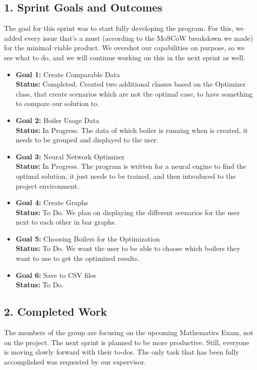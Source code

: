 \documentclass[12pt]{report}
\begin{document}
\subsection*{1. Sprint Goals and Outcomes}
The goal for this sprint was to start fully developing the program. For this, we added every issue that's a must (according to the MoSCoW breakdown we made) for the minimal viable product. We overshot our capabilities on purpose, so we see what to do, and we will continue working on this in the next sprint as well.
\begin{itemize}
    \item \textbf{Goal 1:} Create Comparable Data\\
    \textbf{Status:} Completed. Created two additional classes based on the Optimizer class, that create scenarios which are not the optimal case, to have something to compare our solution to.
    \item \textbf{Goal 2:} Boiler Usage Data\\
    \textbf{Status:} In Progress. The data of which boiler is running when is created, it needs to be grouped and displayed to the user.
    \item \textbf{Goal 3:} Neural Network Optimizer\\
    \textbf{Status:} In Progress. The program is written for a neural engine to find the optimal solution, it just needs to be trained, and then introduced to the project environment.
    \item \textbf{Goal 4:} Create Graphs\\
    \textbf{Status:} To Do. We plan on displaying the different scenarios for the user next to each other in bar graphs.
    \item \textbf{Goal 5:} Choosing Boilers for the Optimization\\
    \textbf{Status:} To Do. We want the user to be able to choose which boilers they want to use to get the optimized results.
    \item \textbf{Goal 6:} Save to CSV files\\
    \textbf{Status:} To Do.
\end{itemize}

\subsection*{2. Completed Work}
The members of the group are focusing on the upcoming Mathematics Exam, not on the project. The next sprint is planned to be more productive. Still, everyone is moving slowly forward with their to-dos. The only task that has been fully accomplished was requested by our supervisor.
\end{document}

